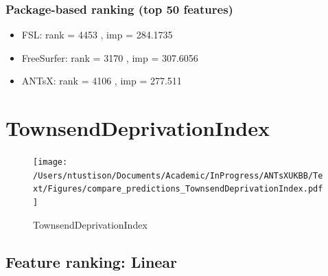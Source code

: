 \documentclass[
  10pt,
]{article}
\begin{document}
\hypertarget{package-based-ranking-top-50-features-4}{%
\subsubsection{Package-based ranking (top 50
features)}\label{package-based-ranking-top-50-features-4}}

\begin{itemize}
\item
  FSL: rank = 4453 , imp = 284.1735
\item
  FreeSurfer: rank = 3170 , imp = 307.6056
\item
  ANTsX: rank = 4106 , imp = 277.511
\end{itemize}

\clearpage

\hypertarget{townsenddeprivationindex}{%
\section{TownsendDeprivationIndex}\label{townsenddeprivationindex}}

\begin{figure}
\centering
\texttt{[image: /Users/ntustison/Documents/Academic/InProgress/ANTsXUKBB/Text/Figures/compare\_predictions\_TownsendDeprivationIndex.pdf]}
\caption{TownsendDeprivationIndex}
\end{figure}

\hypertarget{feature-ranking-linear-3}{%
\subsection{Feature ranking: Linear}\label{feature-ranking-linear-3}}
\end{document}
